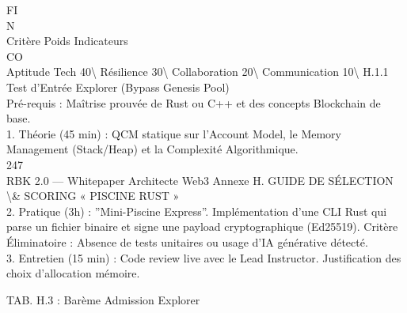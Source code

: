 FI\\
N\\
Critère           Poids Indicateurs\\
CO\\
Aptitude Tech     40\textbackslash{}%
Résilience        30\textbackslash{}%
Collaboration     20\textbackslash{}%
Communication 10\textbackslash{}%
\vspace{0.5em}
\vspace{0.5em}
\vspace{0.5em}
\vspace{0.5em}
H.1.1 Test d’Entrée Explorer (Bypass Genesis Pool)\\
Pré-requis : Maîtrise prouvée de Rust ou C++ et des concepts Blockchain de base.\\
\vspace{0.5em}
1. Théorie (45 min) : QCM statique sur l’Account Model, le Memory Management (Stack/Heap) et la Complexité Algorithmique.\\
\vspace{0.5em}
\vspace{0.5em}
\vspace{0.5em}
247\\
RBK 2.0 — Whitepaper Architecte Web3                                                             Annexe H. GUIDE DE SÉLECTION \textbackslash{}& SCORING « PISCINE RUST »\\
\vspace{0.5em}
\vspace{0.5em}
2. Pratique (3h) : ”Mini-Piscine Express”. Implémentation d’une CLI Rust qui parse un fichier binaire et signe une payload cryptographique (Ed25519). Critère\\
Éliminatoire : Absence de tests unitaires ou usage d’IA générative détecté.\\
\vspace{0.5em}
3. Entretien (15 min) : Code review live avec le Lead Instructor. Justification des choix d’allocation mémoire.\\
\vspace{0.5em}
\vspace{0.5em}
\begin{center}\begin{tabular}TAB. H.3 : Barème Admission Explorer\end{tabular}\end{center}
